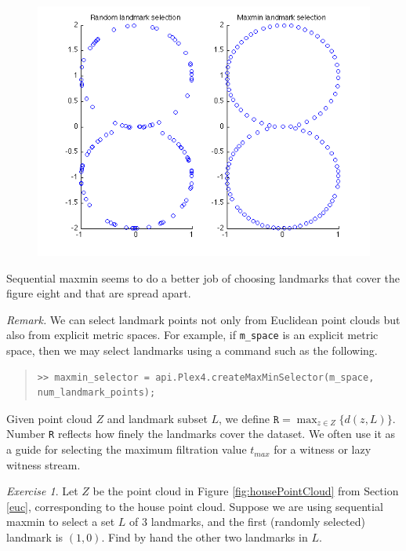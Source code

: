 \documentclass[amscd, amssymb, verbatim]{amsart}[12pt]
\theoremstyle{remark}
\newtheorem{exercise}{Exercise}
\theoremstyle{remark}
\theoremstyle{remark}
\begin{document}
\begin{figure}[htp]
  	\begin{center}
    	\includegraphics[width=5in]{fig8lands}
   	\end{center}
\end{figure}
\FloatBarrier

Sequential maxmin seems to do a better job of choosing landmarks that cover the figure eight and that are spread apart. 

{\em Remark.} We can select landmark points not only from Euclidean point clouds but also from explicit metric spaces. For example, if \texttt{m\_space} is an explicit metric space, then we may select landmarks using a command such as the following.

\begin{quote} \begin{verbatim}
>> maxmin_selector = api.Plex4.createMaxMinSelector(m_space, num_landmark_points); 
\end{verbatim} \end{quote}

Given point cloud $Z$ and landmark subset $L$, we define $\texttt{R} = \max_{z\in Z}\bigl\{d(z,L)\bigr\}$. Number \texttt{R} reflects how finely the landmarks cover the dataset. We often use it as a guide for selecting the maximum filtration value $t_{max}$ for a witness or lazy witness stream. 

\begin{exercise}
Let $Z$ be the point cloud in Figure \ref{fig:housePointCloud} from Section \ref{euc}, corresponding to the house point cloud. Suppose we are using sequential maxmin to select a set $L$ of 3 landmarks, and the first (randomly selected) landmark is $(1,0)$. Find by hand the other two landmarks in $L$. 
\end{exercise}
\end{document}
